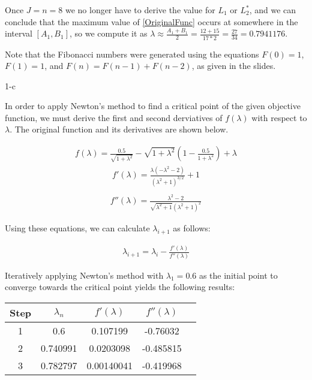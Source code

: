 \documentclass[11pt]{article}
\begin{document}
\begin{sol}
Once $J=n=8$ we no longer have to derive the value for $L_{1}$ or $L_{2}^*$, and we can conclude that the maximum value of \ref{OriginalFunc} occurs at somewhere in the interval $[A_1, B_1]$, so we compute it as $\lambda \approx \frac{A_1+B_1}{2} = \frac{12+15}{17*2} = \frac{27}{34} = 0.7941176$.

Note that the Fibonacci numbers were generated using the equations $F(0) = 1$, $F(1) = 1$, and $F(n) = F(n-1) + F(n-2)$, as given in the slides.

\end{sol}

\begin{prob}{1-c}
\end{prob}
\begin{sol} 

In order to apply Newton's method to find a critical point of the given objective function, we must derive the first and second derviatives of $f(\lambda)$ with respect to $\lambda$. The original function and its derivatives are shown below.

\begin{eqnarray*}
f(\lambda)=\frac{0.5}{\sqrt{1+\lambda^2}}-\sqrt{1+\lambda^2} \left(1-\frac{0.5}{1+\lambda^2}\right)+\lambda
\end{eqnarray*}
\begin{eqnarray*}
f'(\lambda)=\frac{\lambda \left(-\lambda^2-2\right)}{\left(\lambda^2+1\right)^{3/2}}+1 \\
\end{eqnarray*}
\begin{eqnarray*}
f''(\lambda)=\frac{\lambda^2-2}{\sqrt{\lambda^2+1} \left(\lambda^2+1\right)^2}
\end{eqnarray*}

Using these equations, we can calculate $\lambda_{i+1}$ as follows:

\begin{eqnarray*}
\lambda_{i+1} = \lambda_i - \frac{f'(\lambda)}{f''(\lambda)}
\end{eqnarray*}

Iteratively applying Newton's method with $\lambda_1 = 0.6$ as the initial point to converge towards the critical point yields the following results:

\begin{center}
  \begin{tabular}{| c | c | c | c | c |}
    \hline
	Step & $\lambda_{n}$ & $f'(\lambda)$ & $f''(\lambda)$ \\ \hline
	1 & 0.6 & 0.107199 & -0.76032 \\ \hline
	2 & 0.740991 & 0.0203098 & -0.485815 \\ \hline
	3 & 0.782797 & 0.00140041 & -0.419968 \\ \hline	
  \end{tabular}
\end{center}


\end{sol}
\end{document}
